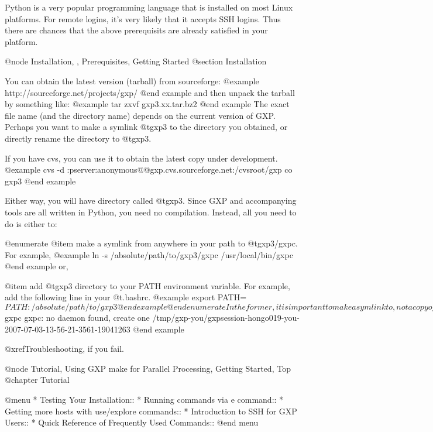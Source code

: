 Python is a very popular programming language that is installed on
most Linux platforms. For remote logins, it's very likely that it
accepts SSH logins. Thus there are chances that the above prerequisits
are already satisfied in your platform.

@node Installation,  , Prerequisites, Getting Started
@section Installation

You can obtain the latest version (tarball) from sourceforge:
@example
    http://sourceforge.net/projects/gxp/
@end example
and then unpack the tarball by something like:
@example
    tar zxvf gxp3.xx.tar.bz2
@end example
The exact file name (and the directory name) depends on the current
version of GXP. Perhaps you want to make a symlink @t{gxp3} to the
directory you obtained, or directly rename the directory to @t{gxp3}.

If you have cvs, you can use it to obtain the latest copy under development.
@example
cvs -d :pserver:anonymous@@gxp.cvs.sourceforge.net:/cvsroot/gxp co gxp3
@end example

Either way, you will have directory called @t{gxp3}. Since GXP and
accompanying tools are all written in Python, you need no compilation.
Instead, all you need to do is either to:

@enumerate
@item make a symlink from anywhere in your path to @t{gxp3/gxpc}. For example,
@example
ln -s /absolute/path/to/gxp3/gxpc /usr/local/bin/gxpc
@end example
or,

@item add @t{gxp3} directory to your PATH environment variable. For example,
add the following line in your @t{.bashrc}.
@example
export PATH=$PATH:/absolute/path/to/gxp3
@end example
@end enumerate

In the former, it is important to make a symlink to, not a copy of,
@t{gxpc}. Otherwise it fails to find accompanying files under @t{gxp3}
directory.

To test your installation, type @t{gxpc} to your shell prompt and see
something like this.
@example
$ gxpc
gxpc: no daemon found, create one
/tmp/gxp-you/gxpsession-hongo019-you-2007-07-03-13-56-21-3561-19041263
@end example

@xref{Troubleshooting}, if you fail.


@node Tutorial, Using GXP make for Parallel Processing, Getting Started, Top
@chapter Tutorial

@menu
* Testing Your Installation::   
* Running commands via e command::  
* Getting more hosts with use/explore commands::  
* Introduction to SSH for GXP Users::  
* Quick Reference of Frequently Used Commands::  
@end menu

